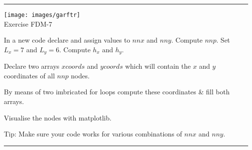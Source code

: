 \begin{center}
\begin{minipage}[t]{0.77\textwidth}
\par\noindent\rule{\textwidth}{0.4pt}

\begin{center}
\texttt{[image: images/garftr]} \\
{\color{orange}Exercise FDM-7}
\end{center}

In a new code declare and assign values to 
$nnx$ and $nny$. Compute $nnp$.
Set $L_x=7$ and $L_y=6$. Compute $h_x$ and $h_y$.

Declare two arrays $xcoords$ and $ycoords$ which will 
contain the $x$ and $y$ coordinates of all $nnp$ nodes.

By means of two imbricated for loops
compute these coordinates \& fill both arrays. 

Visualise the nodes with matplotlib.

Tip: Make sure your code works for various 
combinations of $nnx$ and $nny$.

\par\noindent\rule{\textwidth}{0.4pt}
\end{minipage}
\end{center}






